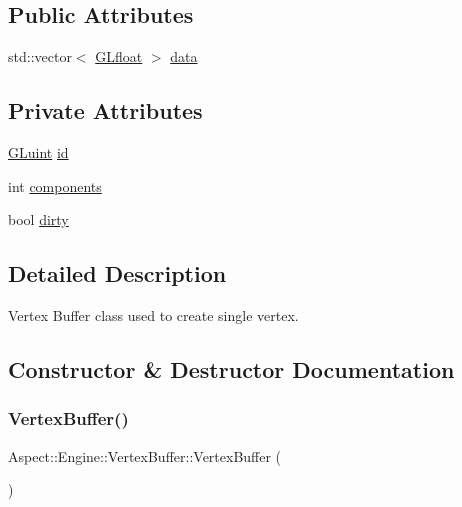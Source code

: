 \subsection*{Public Attributes}
\begin{DoxyCompactItemize}
\item 
std\+::vector$<$ \mbox{\hyperlink{glew_8h_a31aeedaeef29442c9c015ab355c8f5ab}{G\+Lfloat}} $>$ \mbox{\hyperlink{class_aspect_1_1_engine_1_1_vertex_buffer_a61d845bb936f1e6fb7ed92ad19a9c0de}{data}}
\end{DoxyCompactItemize}
\subsection*{Private Attributes}
\begin{DoxyCompactItemize}
\item 
\mbox{\hyperlink{glew_8h_a68c4714e43d8e827d80759f9cb864f3c}{G\+Luint}} \mbox{\hyperlink{class_aspect_1_1_engine_1_1_vertex_buffer_a737c11d95a845ef3f9baea762cd667cf}{id}}
\item 
int \mbox{\hyperlink{class_aspect_1_1_engine_1_1_vertex_buffer_a992776f894fe0cfa5dfcff00e8d57e12}{components}}
\item 
bool \mbox{\hyperlink{class_aspect_1_1_engine_1_1_vertex_buffer_a0de00c758dbbcddc02f358610bac5374}{dirty}}
\end{DoxyCompactItemize}


\subsection{Detailed Description}
Vertex Buffer class used to create single vertex. 

\subsection{Constructor \& Destructor Documentation}
\mbox{\label{class_aspect_1_1_engine_1_1_vertex_buffer_a5d5528d9e3692c8011a165119b78050e}} 
\subsubsection{\texorpdfstring{Vertex\+Buffer()}{VertexBuffer()}}
{\footnotesize\ttfamily Aspect\+::\+Engine\+::\+Vertex\+Buffer\+::\+Vertex\+Buffer (\begin{DoxyParamCaption}{ }\end{DoxyParamCaption})}



